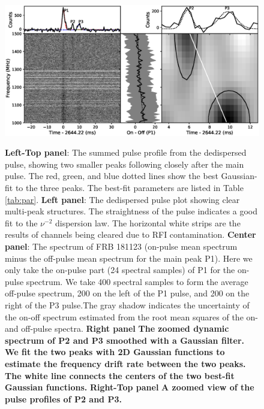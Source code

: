 \begin{figure}%
\centering
\includegraphics[scale=0.7]{dedisp_new.eps} \\ 
\caption{\label{fig:dedisp} 
{\bf Left-Top panel}: The summed pulse profile from the dedispersed pulse, showing two smaller peaks following closely after the main pulse. The red, green, and blue dotted lines show the best Gaussian-fit to the three peaks. The best-fit parameters are listed in Table \ref{tab:par}. {\bf Left panel}: The dedispersed pulse plot showing clear multi-peak structures. The straightness of the pulse indicates a good fit to the $\nu^{-2}$ dispersion law. The horizontal white strips are the results of channels being cleared due to RFI contamination. {\bf Center panel}: The spectrum of FRB 181123 (on-pulse mean spectrum minus the off-pulse mean spectrum for the main peak P1). Here we only take the on-pulse part (24 spectral samples) of P1 for the on-pulse spectrum. We take 400 spectral samples to form the average off-pulse spectrum, 200 on the left of the P1 pulse, and 200 on the right of the P3 pulse.The gray shadow indicates the uncertainty of the on-off spectrum estimated from the root mean squares of the on- and  off-pulse spectra. {\bf Right panel} {\bf The zoomed dynamic spectrum of P2 and P3 smoothed with a Gaussian filter. We fit the two peaks with 2D Gaussian functions to estimate the frequency drift rate between the two peaks. The white line connects the centers of the two best-fit Gaussian functions.} {\bf Right-Top panel} {\bf A zoomed view of the pulse profiles of P2 and P3.}}
\end{figure} 

